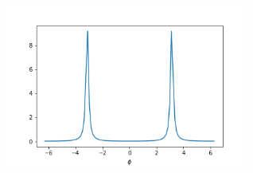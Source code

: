 \begin{ex}
    \label{ex7.15}
    \
    \begin{figure}[H]
        \begin{center}
            \includegraphics[width = 80mm]{./fig/ex7_15.png}
        \end{center}
    \end{figure}
\end{ex}

